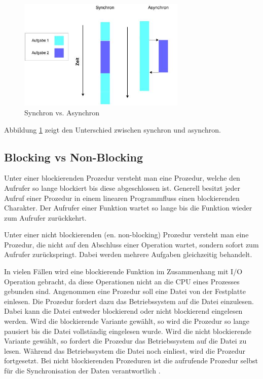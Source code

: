 \begin{figure}[!htb]
  \centering
  \includegraphics[width=8cm]{images/synchron_vs_asynchron.jpg}
  \caption{
    Synchron vs. Asynchron
  }
  \label{figure:syncron_vs_async_}
\end{figure}

Abbildung \ref{figure:syncron_vs_async_} zeigt den Unterschied zwischen synchron und asynchron. 

\subsection{Blocking vs Non-Blocking}

Unter einer blockierenden Prozedur versteht man eine Prozedur, welche den Aufrufer so lange blockiert bis diese abgeschlossen ist. Generell besitzt jeder Aufruf einer Prozedur in einem linearen Programmfluss einen blockierenden Charakter. Der Aufrufer einer Funktion wartet so lange bis die Funktion wieder zum Aufrufer zurückkehrt. 

Unter einer nicht blockierenden (en. non-blocking) Prozedur versteht man eine Prozedur, die nicht auf den Abschluss einer Operation wartet, sondern sofort zum Aufrufer zurückspringt. Dabei werden mehrere Aufgaben gleichzeitig behandelt.  

In vielen Fällen wird eine blockierende Funktion im Zusammenhang mit I/O Operation gebracht, da diese Operationen nicht an die CPU eines Prozesses gebunden sind. Angenommen eine Prozedur soll eine Datei von der Festplatte einlesen. Die Prozedur fordert dazu das Betriebssystem auf die Datei einzulesen. Dabei kann die Datei entweder blockierend oder nicht blockierend eingelesen werden. Wird die blockierende Variante gewählt, so wird die Prozedur so lange pausiert bis die Datei vollständig eingelesen wurde. Wird die nicht blockierende Variante gewählt, so fordert die Prozedur das Betriebssystem auf die Datei zu lesen. Während das Betriebssystem die Datei noch einliest, wird die Prozedur fortgesetzt. Bei nicht blockierenden Prozeduren ist die aufrufende Prozedur selbst für die Synchronisation der Daten verantwortlich \cite[p. 47]{Erb2012}.

